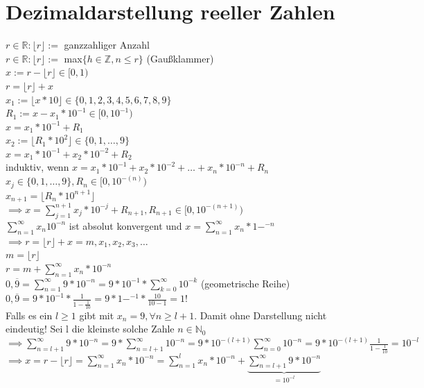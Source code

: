 \documentclass[fleqn]{scrbook}
\newcommand{\sumNI}{\sum_{n=0}^{\infty}}
\newcommand{\sumOI}{\sum_{n=1}^{\infty}}
\begin{document}
\section{Dezimaldarstellung reeller Zahlen}
$r\in\mathbb{R}:\lfloor r \rfloor :=$ ganzzahliger Anzahl\\
$r\in\mathbb{R}:\lfloor r \rfloor :=$ max$\{h\in\mathbb{Z}, n \leq r\}$ (Gaußklammer)\\
$x := r - \lfloor r \rfloor \in [0,1)$\\
$r = \lfloor r \rfloor + x$\\
$x_1 := \lfloor x * 10 \rfloor \in \{0,1,2,3,4,5,6,7,8,9\}$\\
$R_1 := x - x_1 * 10^{-1} \in [0,10^{-1})$\\
$x=x_1*10^{-1} + R_1$\\
$x_2 := \lfloor R_1 * 10^2 \rfloor \in \{0,1,\ldots ,9\}$\\
$x = x_1 * 10^{-1} + x_2 * 10^{-2} + R_2$\\
induktiv, wenn $x = x_1 * 10^{-1} + x_2 * 10^{-2} + \ldots + x_n * 10^{-n} + R_n$\\
$x_j \in \{0,1,\ldots,9\}, R_n \in [0,10^{-(n)})$\\
$x_{n+1} = \lfloor R_n * 10^{n+1} \rfloor$\\
$\implies x=\sum_{j=1}^{n+1} x_j * 10^{-j} + R_{n+1}, R_{n+1} \in [0,10^{-(n+1)})$\\
$\sumOI x_n 10^{-n}$ ist absolut konvergent und $x=\sumOI x_n * 1-^{-n}$\\
$\implies r = \lfloor r \rfloor + x = m,x_1,x_2,x_3,\ldots$\\
$m = \lfloor r \rfloor$\\
$r = m + \sumOI x_n * 10^{-n}$\\
$0,\overline{9} = \sumOI	9 * 10^{-n} = 9 * 10^{-1} * \sum_{k=0}^\infty 10^{-k}$ (geometrische Reihe)\\
$0,\overline{9} = 9 * 10^{-1} * \frac{1}{1-\frac{1}{10}} = 9 * 1-^{-1} * \frac{10}{10-1} = 1$!\\
Falls es ein $l \geq 1$ gibt mit $x_n = 9, \forall n \geq l + 1$. Damit ohne Darstellung nicht eindeutig! Sei l die kleinste solche Zahle $n\in\mathbb{N}_0$\\
$\implies \sum_{n=l+1}^\infty 9 * 10^{-n} = 9 * \sum_{n=l+1}^\infty 10^{-n} = 9 * 10 ^{-(l+1)} \sumNI 10^{-n} = 9 * 10^{-(l+1)} \frac{1}{1-\frac{1}{10}} = 10^{-l}$\\
$\implies x = r - \lfloor r \rfloor = \sumOI x_n * 10^{-n} = \sum_{n=1}^l x_n * 10^{-n} + \underbrace{\sum_{n=l+1}^\infty 9 * 10^{-n}}_{=10^{-l}}$\\
\end{document}

